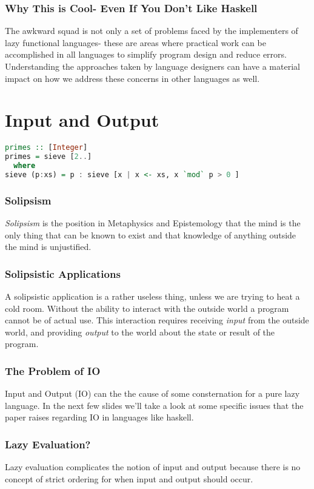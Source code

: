 \documentclass{beamer}
\begin{document}
\begin{frame}
  \frametitle{Why This is Cool- Even If You Don't Like Haskell}
  The awkward squad is not only a set of problems faced by the
  implementers of lazy functional languages- these are areas where
  practical work can be accomplished in all languages to simplify
  program design and reduce errors.  Understanding the approaches
  taken by language designers can have a material impact on how we
  address these concerns in other languages as well.
\end{frame}

\section{Input and Output}
\begin{frame}[fragile]
\begin{center}
\begin{lstlisting}[language=haskell]
primes :: [Integer]
primes = sieve [2..]
  where
sieve (p:xs) = p : sieve [x | x <- xs, x `mod` p > 0 ]
\end{lstlisting}
\end{center}
\end{frame}

\begin{frame}
  \frametitle{Solipsism}
  \emph{Solipsism} is the position in Metaphysics and Epistemology
  that the mind is the only thing that can be known to exist and that
  knowledge of anything outside the mind is unjustified.
\end{frame}

\begin{frame}
  \frametitle{Solipsistic Applications}
  A solipsistic application is a rather useless thing, unless we are
  trying to heat a cold room.  Without the ability to interact with
  the outside world a program cannot be of actual use.  This
  interaction requires receiving \emph{input} from the outside world,
  and providing \emph{output} to the world about the state or result
  of the program.
\end{frame}

\begin{frame}
  \frametitle{The Problem of IO}
  Input and Output (IO) can the the cause of some consternation for a
  pure lazy language.  In the next few slides we'll take a look at
  some specific issues that the paper raises regarding IO in languages
  like haskell.
\end{frame}

\begin{frame}
  \frametitle{Lazy Evaluation?}
  Lazy evaluation complicates the notion of input and output because
  there is no concept of strict ordering for when input and output
  should occur.
\end{frame}
\end{document}
